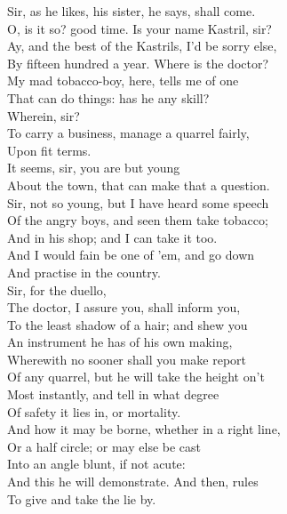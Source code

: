 \documentclass[a4paper,oneside]{memoir}
\begin{document}
\begin{drama*}
\druggerspeaks Sir, as he likes, his sister, he says, shall come.\\
\facespeaks O, is it so? good time. Is your name Kastril, sir?\\
\kastrilspeaks Ay, and the best of the Kastrils, I'd be sorry else,\\
By fifteen hundred a year. Where is the doctor?\\
My mad tobacco-boy, here, tells me of one\\
That can do things: has he any skill?\\
\facespeaks {} Wherein, sir?\\
\kastrilspeaks To carry a business, manage a quarrel fairly,\\
Upon fit terms.\\
\facespeaks {} It seems, sir, you are but young\\
About the town, that can make that a question.\\
\kastrilspeaks Sir, not so young, but I have heard some speech\\
Of the angry boys, and seen them take tobacco;\\
And in his shop; and I can take it too.\\
And I would fain be one of 'em, and go down\\
And practise in the country.\\
\facespeaks {} Sir, for the duello,\\
The doctor, I assure you, shall inform you,\\
To the least shadow of a hair; and shew you\\
An instrument he has of his own making,\\
Wherewith no sooner shall you make report\\
Of any quarrel, but he will take the height on't\\
Most instantly, and tell in what degree\\
Of safety it lies in, or mortality.\\
And how it may be borne, whether in a right line,\\
Or a half circle; or may else be cast\\
Into an angle blunt, if not acute:\\
And this he will demonstrate. And then, rules\\
To give and take the lie by.\\

\end{drama*}
\end{document}
